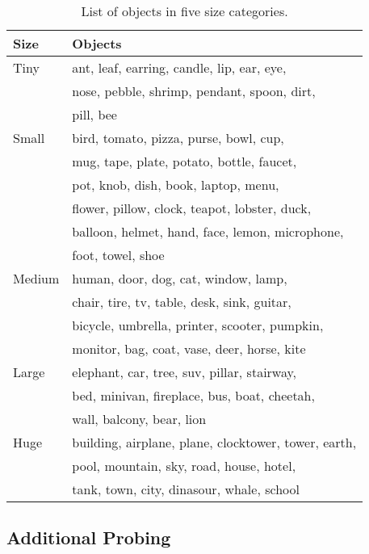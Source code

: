 \documentclass[11pt]{article}
\begin{document}
\begin{table}[ht]
\small
\centering
\begin{tabular}{ll}
\hline
\textbf{Size} & \textbf{Objects}\\
\hline
Tiny & ant, leaf, earring, candle, lip, ear, eye, \\
& nose, pebble, shrimp, pendant, spoon, dirt, \\
& pill, bee \\
Small & bird, tomato, pizza, purse, bowl, cup, \\
& mug, tape, plate, potato, bottle, faucet, \\
& pot, knob, dish, book, laptop, menu, \\
& flower, pillow, clock, teapot, lobster, duck, \\
& balloon, helmet, hand, face, lemon, microphone, \\
& foot, towel, shoe \\
Medium & human, door, dog, cat, window, lamp, \\
& chair, tire, tv, table, desk, sink, guitar, \\
& bicycle, umbrella, printer, scooter, pumpkin, \\
& monitor, bag, coat, vase, deer, horse, kite \\
Large & elephant, car, tree, suv, pillar, stairway, \\
& bed, minivan, fireplace, bus, boat, cheetah, \\
& wall, balcony, bear, lion \\
Huge & building, airplane, plane, clocktower, tower, earth, \\
& pool, mountain, sky, road, house, hotel, \\
& tank, town, city, dinasour, whale, school \\
\hline
\end{tabular}
\caption{\label{obj-size}
List of objects in five size categories.}
\end{table}


\subsection{Additional Probing}
\end{document}

